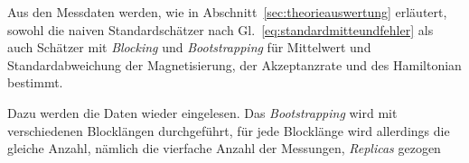 	Aus den Messdaten werden, wie in Abschnitt~\ref{sec:theorieauswertung} erläutert, sowohl die naiven Standardschätzer nach Gl.~\ref{eq:standardmitteundfehler} als auch Schätzer mit \textit{Blocking} und \textit{Bootstrapping} für Mittelwert und Standardabweichung der Magnetisierung, der Akzeptanzrate und des Hamiltonian bestimmt.
	
	Dazu werden die Daten wieder eingelesen. Das \textit{Bootstrapping} wird mit verschiedenen Blocklängen durchgeführt, für jede Blocklänge wird allerdings die gleiche Anzahl, nämlich die vierfache Anzahl der Messungen, \textit{Replicas} gezogen
	
	
	
	
	
	
	
